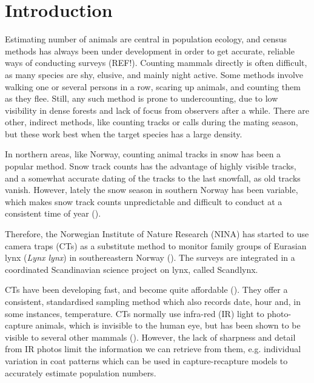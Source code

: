 \chapter{Introduction}
%
Estimating number of animals are central in population ecology, and census methods has always been under development in order to get accurate, reliable ways of conducting surveys (REF!). %
Counting mammals directly is often difficult, as many species are shy, elusive, and mainly night active.
Some methods involve walking one or several persons in a row, scaring up animals, and counting them as they flee.
Still, any such method is prone to undercounting, due to low visibility in dense forests and lack of focus from observers after a while.
There are other, indirect methods, like counting tracks or calls during the mating season, but these work best when the target species has a large density. %

In northern areas, like Norway, counting animal tracks in snow has been a popular method. %
Snow track counts has the advantage of highly visible tracks, and a somewhat accurate dating of the tracks to the last snowfall, as old tracks vanish.
However, lately the snow season in southern Norway has been variable, which makes snow track counts unpredictable and difficult to conduct at a consistent time of year (\cite{Odden2015}).

Therefore, the Norwegian Institute of Nature Research (NINA) has started to use camera traps (CTs) as a substitute method to monitor family groups of Eurasian lynx (\textit{Lynx lynx}) in southereastern Norway  (\cite{Odden2015}). The surveys are integrated in a coordinated Scandinavian science project on lynx, called Scandlynx. %

CTs have been developing fast, and become quite affordable (\cite{Burton2015}).
They offer a consistent, standardised sampling method which also records date, hour and, in some instances, temperature.
CTs normally use infra-red (IR) light to photo-capture animals, which is invisible to the human eye, but has been shown to be visible to several other mammals (\cite{Meek2014}).
However, the lack of sharpness and detail from IR photos limit the information we can retrieve from them, e.g. individual variation in coat patterns which can be used in capture-recapture models to accurately estimate population numbers. 

